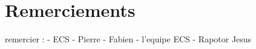 \section{Remerciements}
remercier :
  - ECS
  - Pierre
  - Fabien
  - l'equipe ECS
  - Rapotor Jesus
  
